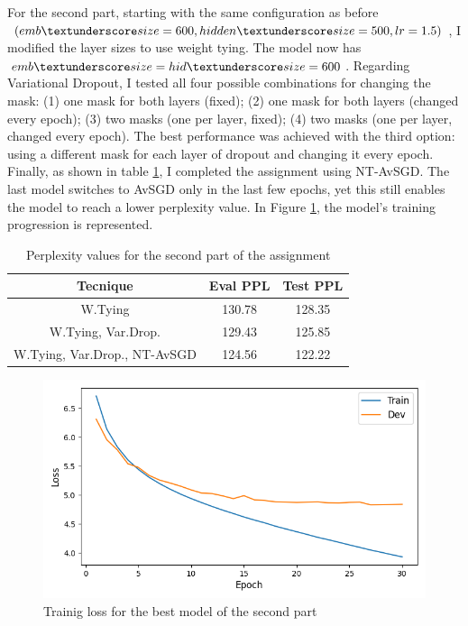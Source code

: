 \documentclass[a4paper]{article}
\begin{document}
For the second part, starting with the same configuration as before \((emb \textunderscore size=600, hidden \textunderscore size=500, lr=1.5)\), I modified the layer sizes to use weight tying.
The model now has \(emb \textunderscore size=hid \textunderscore size=600\).
Regarding Variational Dropout, I tested all four possible combinations for changing the mask: (1) one mask for both layers (fixed); (2) one mask for both layers (changed every epoch); (3) two masks (one per layer, fixed); (4) two masks (one per layer, changed every epoch). The best performance was achieved with the third option: using a different mask for each layer of dropout and changing it every epoch.
Finally, as shown in table \ref{tab:results2}, I completed the assignment using NT-AvSGD.
The last model switches to AvSGD only in the last few epochs, yet this still enables the model to reach a lower perplexity value.
In Figure \ref{fig:fig2}, the model's training progression is represented.

\begin{table}[h]
  \centering
  \begin{tabular}{|c|c|c|}
    \hline
    \textbf{Tecnique} & \textbf{Eval PPL} & \textbf{Test PPL} \\
    \hline
    W.Tying & 130.78 & 128.35 \\
    W.Tying, Var.Drop. & 129.43 & 125.85 \\
    W.Tying, Var.Drop., NT-AvSGD & 124.56 & 122.22 \\
    \hline
  \end{tabular}
  \caption{Perplexity values for the second part of the assignment}
  \label{tab:results2}

\end{table}

\begin{figure}[h]
  \includegraphics[width=\linewidth]{./images/plot_2_loss.png}
  \caption{Trainig loss for the best model of the second part}
  \label{fig:fig2}
\end{figure}





\end{document}
